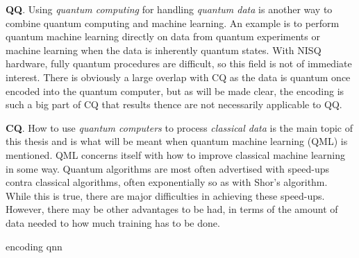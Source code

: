 \textbf{QQ}. Using \textit{quantum computing} for handling \textit{quantum data} is another way to combine quantum computing and machine learning.
An example is to perform quantum machine learning directly on data from quantum experiments or machine learning when the data is inherently quantum states.
With NISQ hardware, fully quantum procedures are difficult, so this field is not of immediate interest.
There is obviously a large overlap with CQ as the data is quantum once encoded into the quantum computer, but as will be made clear, the encoding is such a big part of CQ that results thence are not necessarily applicable to QQ.

\textbf{CQ}. How to use \textit{quantum computers} to process \textit{classical data} is the main topic of this thesis and is what will be meant when quantum machine learning (QML) is mentioned.
QML concerns itself with how to improve classical machine learning in some way.
Quantum algorithms are most often advertised with speed-ups contra classical algorithms, often exponentially so as with Shor's algorithm.
While this is true, there are major difficulties in achieving these speed-ups.
However, there may be other advantages to be had, in terms of the amount of data needed to how much training has to be done.


{encoding}
{qnn}
